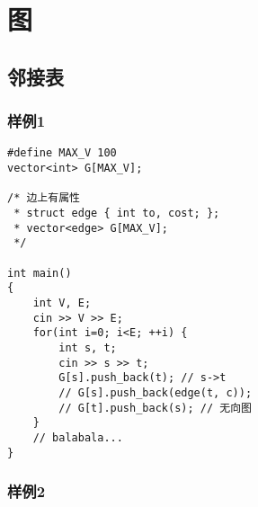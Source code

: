 \documentclass[a4paper]{ctexrep}
\begin{document}
\chapter{图}
\section{邻接表}
\subsection{样例1}
\begin{lstlisting}
#define MAX_V 100
vector<int> G[MAX_V];

/* 边上有属性
 * struct edge { int to, cost; };
 * vector<edge> G[MAX_V];
 */

int main()
{
	int V, E;
	cin >> V >> E;
	for(int i=0; i<E; ++i) {
		int s, t;
		cin >> s >> t;
		G[s].push_back(t); // s->t
		// G[s].push_back(edge(t, c));
		// G[t].push_back(s); // 无向图
	}
	// balabala...
}
\end{lstlisting}


\subsection{样例2}
\end{document}
